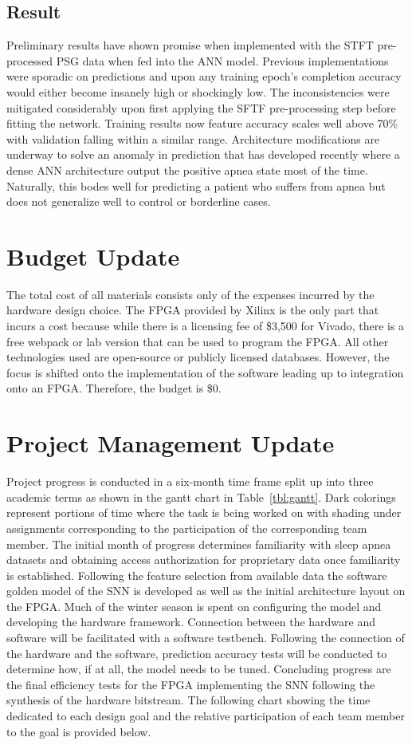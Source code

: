 \documentclass[12pt,titlepage]{article}
\begin{document}
\subsection{Result}
Preliminary results have shown promise when implemented with the STFT pre-processed PSG data when fed into the ANN model. Previous implementations were sporadic on predictions and upon any training epoch’s completion accuracy would either become insanely high or shockingly low. The inconsistencies were mitigated considerably upon first applying the SFTF pre-processing step before fitting the network. Training results now feature accuracy scales well above 70\% with validation falling within a similar range. Architecture modifications are underway to solve an anomaly in prediction that has developed recently where a dense ANN architecture output the positive apnea state most of the time. Naturally, this bodes well for predicting a patient who suffers from apnea but does not generalize well to control or borderline cases. 

\section{Budget Update}
The total cost of all materials consists only of the expenses incurred by the hardware design choice. The FPGA provided by Xilinx is
the only part that incurs a cost because while there is a licensing fee of \$3,500 for Vivado, there is a free webpack or lab version
that can be used to program the FPGA. All other technologies used are open-source or publicly licensed databases. However, the focus
is shifted onto the implementation of the software leading up to integration onto an FPGA. Therefore, the budget is \$0.

\section{Project Management Update}
Project progress is conducted in a six-month time frame split up into three academic terms as shown in the gantt chart in Table~\ref{tbl:gantt}.
Dark colorings represent portions of time where the task is being worked on with shading under assignments corresponding to the participation of
the corresponding team member. The initial month of progress determines familiarity with sleep
apnea datasets and obtaining access authorization for proprietary data once familiarity is established. Following the feature selection from available data
the software golden model of the SNN is developed as well as the initial architecture layout on the FPGA. Much of the winter season is spent on configuring
the model and developing the hardware framework. Connection between the hardware and software will be facilitated with a software testbench. Following the
connection of the hardware and the software, prediction accuracy tests will be conducted to determine how, if at all, the model needs to be tuned. Concluding
progress are the final efficiency tests for the FPGA implementing the SNN following the synthesis of the hardware bitstream. The following chart showing the
time dedicated to each design goal and the relative participation of each team member to the goal is provided below.
\end{document}
